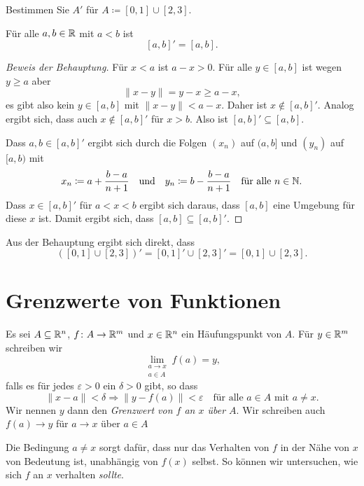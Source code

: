 \documentclass[a4paper,10pt]{article}
\begin{document}
\begin{question}
 Bestimmen Sie $A'$ für $A \coloneqq [0,1] \cup [2,3]$.
\end{question}
\begin{solution}
 \begin{beh}
  Für alle $a, b \in \mathbb{R}$ mit $a < b$ ist
  \[
   [a,b]' = [a,b].
  \]
 \end{beh}
 \begin{proof}[Beweis der Behauptung]
  Für $x < a$  ist $a-x > 0$. Für alle $y \in [a,b]$ ist wegen $y \geq a$ aber
  \[
   \|x-y\| = y-x \geq a-x,
  \]
  es gibt also kein $y \in [a,b]$ mit $\|x-y\| < a-x$. Daher ist $x \notin [a,b]'$.  Analog ergibt sich, dass auch $x \notin [a,b]'$ für $x > b$. Also ist $[a,b]' \subseteq [a,b]$.
  
  Dass $a,b \in [a,b]'$ ergibt sich durch die Folgen $(x_n)$ auf $(a,b]$ und $(y_n)$ auf $[a,b)$ mit
  \[
   x_n \coloneqq a + \frac{b-a}{n+1}
   \quad
   \text{und}
   \quad
   y_n \coloneqq b - \frac{b-a}{n+1}
   \quad
   \text{für alle $n \in \mathbb{N}$}.
  \]
  Dass $x \in [a,b]'$ für $a < x < b$ ergibt sich daraus, dass $[a,b]$ eine Umgebung für diese $x$ ist. Damit ergibt sich, dass $[a,b] \subseteq [a,b]'$.
 \end{proof}
 
 Aus der Behauptung ergibt sich direkt, dass
 \[
  ([0,1] \cup [2,3])'
  = [0,1]' \cup [2,3]'
  = [0,1] \cup [2,3].
 \]
\end{solution}





\section{Grenzwerte von Funktionen}


\begin{defi}
 Es sei $A \subseteq \mathbb{R}^n$, $f \colon A \to \mathbb{R}^m$ und $x \in \mathbb{R}^n$ ein Häufungspunkt von $A$. Für $y \in \mathbb{R}^m$ schreiben wir
 \[
  \lim_{\substack{a \to x \\ a \in A}} f(a) = y,
 \]
 falls es für jedes $\varepsilon > 0$ ein $\delta > 0$ gibt, so dass
 \[
  \|x-a\| < \delta \Rightarrow \|y-f(a)\| < \varepsilon
  \quad
  \text{für alle $a \in A$ mit $a \neq x$}.
 \]
 Wir nennen $y$ dann den \emph{Grenzwert von $f$ an $x$ über $A$}. Wir schreiben auch $f(a) \to y$ für $a \to x$ über $a \in A$
\end{defi}


Die Bedingung $a \neq x$ sorgt dafür, dass nur das Verhalten von $f$ in der Nähe von $x$ von Bedeutung ist, unabhängig von $f(x)$ selbst. So können wir untersuchen, wie sich $f$ an $x$ verhalten \emph{sollte}.
\end{document}
